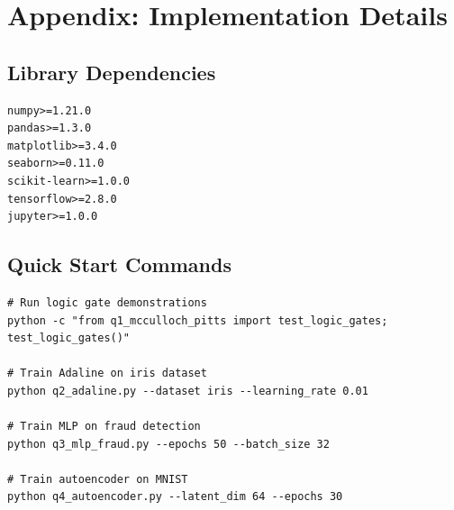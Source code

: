 \documentclass[conference]{IEEEtran}
\begin{document}
\section{Appendix: Implementation Details}\label{appendix:code}

\subsection{Library Dependencies}
\begin{lstlisting}
numpy>=1.21.0
pandas>=1.3.0
matplotlib>=3.4.0
seaborn>=0.11.0
scikit-learn>=1.0.0
tensorflow>=2.8.0
jupyter>=1.0.0
\end{lstlisting}

\subsection{Quick Start Commands}
\begin{lstlisting}
# Run logic gate demonstrations
python -c "from q1_mcculloch_pitts import test_logic_gates; test_logic_gates()"

# Train Adaline on iris dataset
python q2_adaline.py --dataset iris --learning_rate 0.01

# Train MLP on fraud detection
python q3_mlp_fraud.py --epochs 50 --batch_size 32

# Train autoencoder on MNIST
python q4_autoencoder.py --latent_dim 64 --epochs 30
\end{lstlisting}

\nocite{*}


\end{document}
